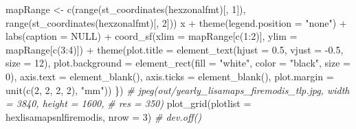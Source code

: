 \documentclass[10pt,landscape,a3paper]{article}
\newenvironment{Shaded}{\begin{snugshade}}{\end{snugshade}}
\newcommand{\AttributeTok}[1]{\textcolor[rgb]{0.77,0.63,0.00}{#1}}
\newcommand{\CommentTok}[1]{\textcolor[rgb]{0.56,0.35,0.01}{\textit{#1}}}
\newcommand{\ConstantTok}[1]{\textcolor[rgb]{0.00,0.00,0.00}{#1}}
\newcommand{\DecValTok}[1]{\textcolor[rgb]{0.00,0.00,0.81}{#1}}
\newcommand{\FloatTok}[1]{\textcolor[rgb]{0.00,0.00,0.81}{#1}}
\newcommand{\FunctionTok}[1]{\textcolor[rgb]{0.00,0.00,0.00}{#1}}
\newcommand{\NormalTok}[1]{#1}
\newcommand{\OtherTok}[1]{\textcolor[rgb]{0.56,0.35,0.01}{#1}}
\newcommand{\SpecialCharTok}[1]{\textcolor[rgb]{0.00,0.00,0.00}{#1}}
\newcommand{\StringTok}[1]{\textcolor[rgb]{0.31,0.60,0.02}{#1}}
\begin{document}
\begin{Shaded}
\begin{Highlighting}[]
\NormalTok{    mapRange }\OtherTok{\textless{}{-}} \FunctionTok{c}\NormalTok{(}\FunctionTok{range}\NormalTok{(}\FunctionTok{st\_coordinates}\NormalTok{(hexzonalfmt)[, }\DecValTok{1}\NormalTok{]), }\FunctionTok{range}\NormalTok{(}\FunctionTok{st\_coordinates}\NormalTok{(hexzonalfmt)[,}
        \DecValTok{2}\NormalTok{]))}
\NormalTok{    x }\SpecialCharTok{+} \FunctionTok{theme}\NormalTok{(}\AttributeTok{legend.position =} \StringTok{"none"}\NormalTok{) }\SpecialCharTok{+} \FunctionTok{labs}\NormalTok{(}\AttributeTok{caption =} \ConstantTok{NULL}\NormalTok{) }\SpecialCharTok{+} \FunctionTok{coord\_sf}\NormalTok{(}\AttributeTok{xlim =}\NormalTok{ mapRange[}\FunctionTok{c}\NormalTok{(}\DecValTok{1}\SpecialCharTok{:}\DecValTok{2}\NormalTok{)],}
        \AttributeTok{ylim =}\NormalTok{ mapRange[}\FunctionTok{c}\NormalTok{(}\DecValTok{3}\SpecialCharTok{:}\DecValTok{4}\NormalTok{)]) }\SpecialCharTok{+} \FunctionTok{theme}\NormalTok{(}\AttributeTok{plot.title =} \FunctionTok{element\_text}\NormalTok{(}\AttributeTok{hjust =} \FloatTok{0.5}\NormalTok{, }\AttributeTok{vjust =} \SpecialCharTok{{-}}\FloatTok{0.5}\NormalTok{,}
        \AttributeTok{size =} \DecValTok{12}\NormalTok{), }\AttributeTok{plot.background =} \FunctionTok{element\_rect}\NormalTok{(}\AttributeTok{fill =} \StringTok{"white"}\NormalTok{, }\AttributeTok{color =} \StringTok{"black"}\NormalTok{,}
        \AttributeTok{size =} \DecValTok{0}\NormalTok{), }\AttributeTok{axis.text =} \FunctionTok{element\_blank}\NormalTok{(), }\AttributeTok{axis.ticks =} \FunctionTok{element\_blank}\NormalTok{(), }\AttributeTok{plot.margin =} \FunctionTok{unit}\NormalTok{(}\FunctionTok{c}\NormalTok{(}\DecValTok{2}\NormalTok{,}
        \DecValTok{2}\NormalTok{, }\DecValTok{2}\NormalTok{, }\DecValTok{2}\NormalTok{), }\StringTok{"mm"}\NormalTok{))}
\NormalTok{\})}
\CommentTok{\# jpeg(\textquotesingle{}out/yearly\_lisamaps\_firemodis\_tlp.jpg\textquotesingle{}, width = 3840, height = 1600,}
\CommentTok{\# res = 350)}
\FunctionTok{plot\_grid}\NormalTok{(}\AttributeTok{plotlist =}\NormalTok{ hexlisamapsnlfiremodis, }\AttributeTok{nrow =} \DecValTok{3}\NormalTok{)}
\CommentTok{\# dev.off()}


\end{Highlighting}
\end{Shaded}
\end{document}
